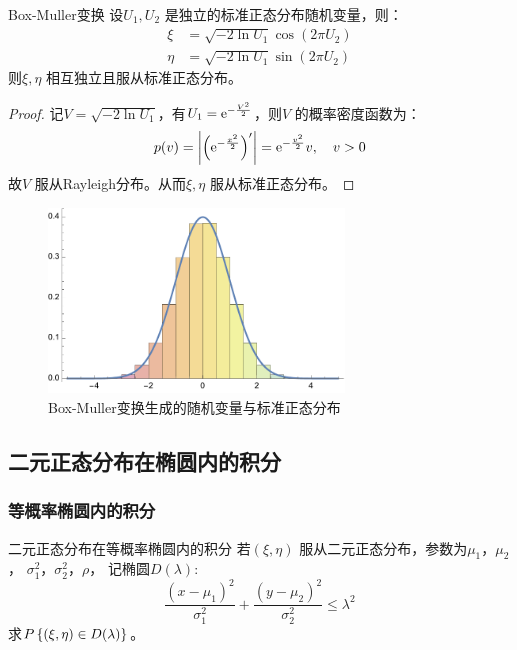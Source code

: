 \begin{theorem}{Box-Muller变换}
    设\(U_{1}, U_{2}\) 是独立的标准正态分布随机变量，则：
    \begin{align*}
        \xi &= \sqrt{-2\ln U_{1}} \cos(2\pi U_{2})\\
        \eta &= \sqrt{-2\ln U_{1}} \sin(2\pi U_{2})
    \end{align*}
    则\(\xi, \eta\) 相互独立且服从标准正态分布。
\end{theorem}

\begin{proof}
    记\(V=\sqrt{-2 \ln U_{1}}\)，有\(U_{1}=
    \e^{-\frac{V^{2}}{2}}\)，则\(V\) 的概率密度函数为：
    \[
        p(v) = \abs{\left(\e^{-\frac{x^{2}}{2}} \right)'} =
        \e^{-\frac{v^{2}}{2}} v, \quad v>0
    \]
    故\(V\) 服从Rayleigh分布。从而\(\xi,\eta\) 服从标准正态分布。
\end{proof}
\begin{figure}[H]
    \centering
    \includegraphics[width=0.7\textwidth]{resources/box_muller_transform.pdf}
    \caption{Box-Muller变换生成的随机变量与标准正态分布}
\end{figure}

\subsection{二元正态分布在椭圆内的积分}

\subsubsection{等概率椭圆内的积分}

\begin{problem}{二元正态分布在等概率椭圆内的积分}
    若\((\xi,\eta)\) 服从二元正态分布，参数为\(\mu_{1}\)，\(\mu_{2}\)，
    \(\sigma_{1}^{2}\)，\(\sigma_{2}^{2}\)，\(\rho\)，
    记椭圆\(D(\lambda)\):\[
        \frac{(x-\mu_{1})^{2}}{\sigma_{1}^{2}} +
        \frac{(y-\mu_{2})^{2}}{\sigma_{2}^{2}} \leq \lambda^{2}
    \]
    求\(\P{(\xi,\eta) \in D(\lambda)}\)。
\end{problem}

